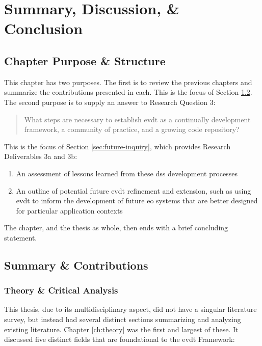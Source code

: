 \chapter{Summary, Discussion, \& Conclusion} \label{ch:conclusion}

\section{Chapter Purpose \& Structure}

This chapter has two purposes. The first is to review the previous chapters and summarize the contributions presented in each. This is the focus of Section \ref{sec:summary}. The second purpose is to supply an answer to Research Question 3:

\blockquote{What steps are necessary to establish \acf{evdt} as a continually development framework, a community of practice, and a growing code repository?}

This is the focus of Section \ref{sec:future-inquiry}, which provides Research Deliverables 3a and 3b:

	\begin{enumerate}[label=\emph{\alph*},itemsep=0pt,parsep=0pt]
		\item{An assessment of lessons learned from these \acf{dss} development processes} 
		\item{An outline of potential future \ac{evdt} refinement and extension, such as using \ac{evdt} to inform the development of future \acf{eo} systems that are better designed for particular application contexts}
	\end{enumerate}
	
The chapter, and the thesis as whole, then ends with a brief concluding statement.

\section{Summary \& Contributions} \label{sec:summary}

\subsection{Theory \& Critical Analysis}

This thesis, due to its multidisciplinary aspect, did not have a singular literature survey, but instead had several distinct sections summarizing and analyzing existing literature. Chapter \ref{ch:theory} was the first and largest of these. It discussed five distinct fields that are foundational to the \ac{evdt} Framework:

